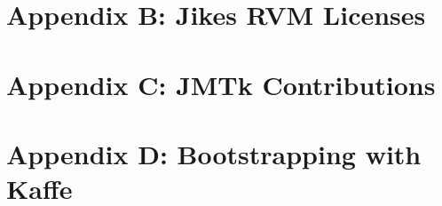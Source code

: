 \documentclass{article}
\begin{document}
\T \newpage
{}
\section{Appendix B: Jikes RVM Licenses}
\label{appendix:licenses}


\T \newpage
{}
\section{Appendix C: JMTk Contributions}
\label{appendix:contributions}


\T \newpage
{}
\section{Appendix D: Bootstrapping with Kaffe}
\label{appendix:kaffe}


\W \section*{\indexname}\label{hlxindex}
\W \htmlprintindex
\T \printindex

 \W {}
 \W 
\end{document}
